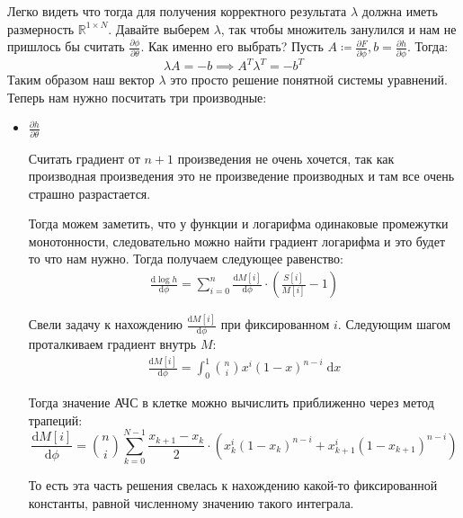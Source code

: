\documentclass[10pt]{article}
\theoremstyle{plain}
\theoremstyle{remark}
\newcommand{\R}{\mathbb{R}}
\begin{document}
Легко видеть что тогда для получения корректного результата $\lambda$ должна иметь размерность $\R^{1 \times N}$.
Давайте выберем $\lambda$, так чтобы множитель занулился и нам не пришлось бы считать $\frac{\partial \phi}{\partial \theta}$. Как именно его выбрать?
Пусть $A \coloneqq \frac{\partial F}{\partial \phi}, b = \frac{\partial h}{\partial \phi}$. Тогда:
\begin{equation*}
  \lambda A = -b \implies A^T \lambda^T = -b^T
\end{equation*}
Таким образом наш вектор $\lambda$ это просто решение понятной системы уравнений. Теперь нам нужно посчитать три производные:

\begin{itemize}
  \item $\boxed{\frac{\partial h}{\partial \theta}}$

  Считать градиент от $n + 1$  произведения не очень хочется, так как производная произведения это не
  произведение производных и там все очень страшно разрастается.

  Тогда можем заметить, что у функции и логарифма одинаковые промежутки монотонности, следовательно можно найти градиент логарифма и это будет то что нам нужно.
  Тогда получаем следующее равенство:
  \begin{gather*}
    \frac{\mathrm{d} \log h}{\mathrm{d} \phi} = \sum_{i = 0}^{n} 
    \frac{\mathrm{d} M[i]}{\mathrm{d} \phi} \cdot \left(\frac{S[i]}{M[i]} - 1\right)
  \end{gather*}
  
  Свели задачу к нахождению $\frac{\mathrm{d} M[i]}{\mathrm{d} \phi}$ при фиксированном  $i$. Следующим шагом проталкиваем градиент внутрь $M$:
  \begin{gather*}
    \frac{\mathrm{d} M[i]}{\mathrm{d} \phi} = 
    \int_0^1
    \binom{n}{i} x^{i} (1 - x)^{n - i}  \; \mathrm{d}x
  \end{gather*}
  
  Тогда значение АЧС в клетке можно вычислить приближенно через метод трапеций:
  \begin{equation*}
    \frac{\mathrm{d} M[i]}{\mathrm{d} \phi} = \binom{n}{i}\sum_{k = 0}^{N - 1} \frac{x_{k + 1} - x_k}{2} \cdot (x_k^{i} (1 - x_k)^{n - i} + x_{k + 1}^{i} (1 - x_{k + 1})^{n - i})
  \end{equation*}
  
  То есть эта часть решения свелась к нахождению какой-то фиксированной константы, равной численному значению такого интеграла.


\end{itemize}
\end{document}
